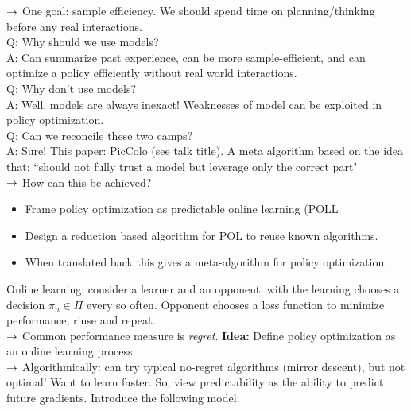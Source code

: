$\rightarrow$ One goal: sample efficiency. We should spend time on planning/thinking before any real interactions. \\

Q: Why should we use models? \\

A: Can summarize past experience, can be more sample-efficient, and can optimize a policy efficiently without real world interactions. \\

Q: Why don't use models? \\

A: Well, models are always inexact! Weaknesses of model can be exploited in policy optimization. \\

Q: Can we reconcile these two camps? \\

A: Sure! This paper: PicColo (see talk title). A meta algorithm based on the idea that: ``should not fully trust a model but leverage only the correct part" \\

$\rightarrow$ How can this be achieved?
\begin{itemize}
    \item Frame policy optimization as predictable online learning (POLL
    \item Design a reduction based algorithm for POL to reuse known algorithms.
    \item When translated back this gives a meta-algorithm for policy optimization.
\end{itemize}

Online learning: consider a learner and an opponent, with the learning chooses a decision $\pi_n \in \Pi$ every so often. Opponent chooses a loss function to minimize performance, rinse and repeat. \\

$\rightarrow$ Common performance measure is {\it regret}. {\bf Idea:} Define policy optimization as an online learning process. \\

$\rightarrow$ Algorithmically: can try typical no-regret algorithms (mirror descent), but not optimal! Want to learn faster. So, view predictability as the ability to predict future gradients. Introduce the following model:


